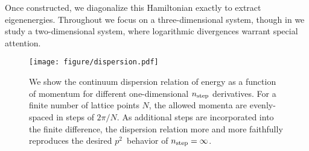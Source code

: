 Once constructed, we diagonalize this Hamiltonian exactly to extract eigenenergies.
Throughout we focus on a three-dimensional system, though in  we study a two-dimensional system, where logarithmic divergences warrant special attention.

\begin{figure}
    \texttt{[image: figure/dispersion.pdf]}
    \caption{We show the continuum dispersion relation of energy as a function of momentum for different one-dimensional ${n_\text{step}}$ derivatives.  For a finite number of lattice points $N$, the allowed momenta are evenly-spaced in steps of $2\pi/N$.
    As additional steps are incorporated into the finite difference, the dispersion relation more and more faithfully reproduces the desired $p^2$~behavior of ${n_\text{step}}=\infty$.
    }
    \label{fig:dispersion relation}
\end{figure}
